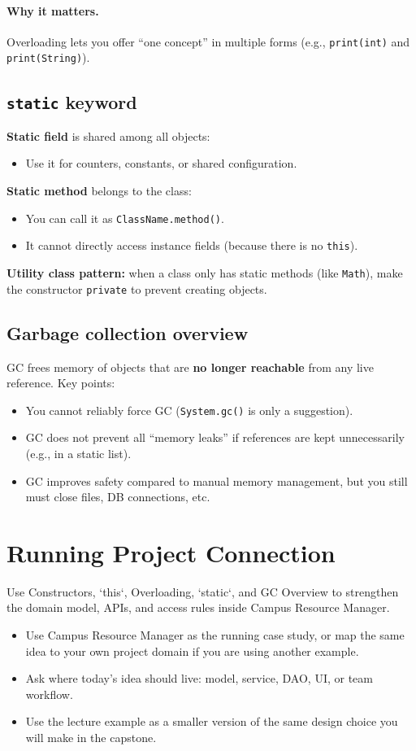\documentclass[11pt]{article}
\begin{document}
\paragraph{Why it matters.} Overloading lets you offer ``one concept'' in multiple forms (e.g., \texttt{print(int)} and \texttt{print(String)}).

\subsection{\texttt{static} keyword}
\textbf{Static field} is shared among all objects:
\begin{itemize}
  \item Use it for counters, constants, or shared configuration.
\end{itemize}

\textbf{Static method} belongs to the class:
\begin{itemize}
  \item You can call it as \texttt{ClassName.method()}.
  \item It cannot directly access instance fields (because there is no \texttt{this}).
\end{itemize}

\textbf{Utility class pattern:} when a class only has static methods (like \texttt{Math}), make the constructor \texttt{private} to prevent creating objects.

\subsection{Garbage collection overview}
GC frees memory of objects that are \textbf{no longer reachable} from any live reference.
Key points:
\begin{itemize}
  \item You cannot reliably force GC (\texttt{System.gc()} is only a suggestion).
  \item GC does not prevent all ``memory leaks'' if references are kept unnecessarily (e.g., in a static list).
  \item GC improves safety compared to manual memory management, but you still must close files, DB connections, etc.
\end{itemize}
\notesources{\OOPSUnitIISources}

\section{Running Project Connection}
Use Constructors, `this`, Overloading, `static`, and GC Overview to strengthen the domain model, APIs, and access rules inside Campus Resource Manager.
\begin{itemize}
  \item Use Campus Resource Manager as the running case study, or map the same idea to your own project domain if you are using another example.
  \item Ask where today's idea should live: model, service, DAO, UI, or team workflow.
  \item Use the lecture example as a smaller version of the same design choice you will make in the capstone.
\end{itemize}
\notesources{\OOPSUnitIISources}
\end{document}
